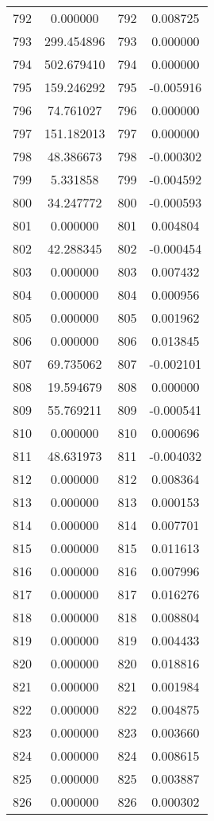 \documentclass[12pt]{article}
\begin{document}
\begin{longtable}{@{}cccc@{}}
792 & 0.000000 & 792 & 0.008725 \\
793 & 299.454896 & 793 & 0.000000 \\
794 & 502.679410 & 794 & 0.000000 \\
795 & 159.246292 & 795 & -0.005916 \\
796 & 74.761027 & 796 & 0.000000 \\
797 & 151.182013 & 797 & 0.000000 \\
798 & 48.386673 & 798 & -0.000302 \\
799 & 5.331858 & 799 & -0.004592 \\
800 & 34.247772 & 800 & -0.000593 \\
801 & 0.000000 & 801 & 0.004804 \\
802 & 42.288345 & 802 & -0.000454 \\
803 & 0.000000 & 803 & 0.007432 \\
804 & 0.000000 & 804 & 0.000956 \\
805 & 0.000000 & 805 & 0.001962 \\
806 & 0.000000 & 806 & 0.013845 \\
807 & 69.735062 & 807 & -0.002101 \\
808 & 19.594679 & 808 & 0.000000 \\
809 & 55.769211 & 809 & -0.000541 \\
810 & 0.000000 & 810 & 0.000696 \\
811 & 48.631973 & 811 & -0.004032 \\
812 & 0.000000 & 812 & 0.008364 \\
813 & 0.000000 & 813 & 0.000153 \\
814 & 0.000000 & 814 & 0.007701 \\
815 & 0.000000 & 815 & 0.011613 \\
816 & 0.000000 & 816 & 0.007996 \\
817 & 0.000000 & 817 & 0.016276 \\
818 & 0.000000 & 818 & 0.008804 \\
819 & 0.000000 & 819 & 0.004433 \\
820 & 0.000000 & 820 & 0.018816 \\
821 & 0.000000 & 821 & 0.001984 \\
822 & 0.000000 & 822 & 0.004875 \\
823 & 0.000000 & 823 & 0.003660 \\
824 & 0.000000 & 824 & 0.008615 \\
825 & 0.000000 & 825 & 0.003887 \\
826 & 0.000000 & 826 & 0.000302 \\

\end{longtable}
\end{document}
